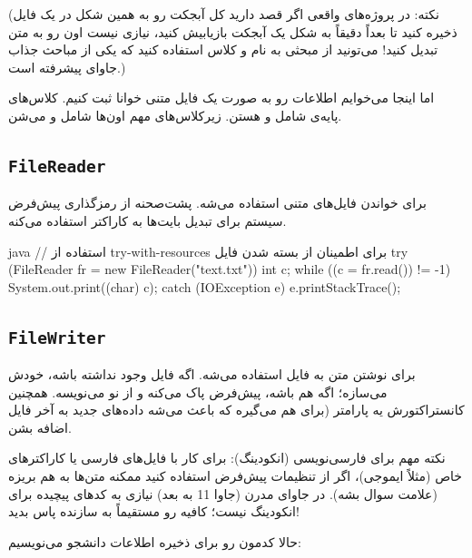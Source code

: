 (نکته: در پروژه‌های واقعی اگر قصد دارید کل آبجکت  رو
به همین شکل در یک فایل ذخیره کنید تا بعداً دقیقاً به شکل یک آبجکت بازیابیش
کنید، نیازی نیست اون رو به متن تبدیل کنید! می‌تونید از مبحثی به نام
 و کلاس 
استفاده کنید که یکی از مباحث جذاب جاوای پیشرفته است.)

اما اینجا می‌خوایم اطلاعات رو به صورت یک فایل متنی خوانا ثبت کنیم.
کلاس‌های پایه‌ی  شامل  و
 هستن. زیرکلاس‌های مهم اون‌ها شامل
 و  می‌شن.

\subsection{\texttt{FileReader}}

برای خواندن فایل‌های متنی استفاده می‌شه. پشت‌صحنه از رمزگذاری پیش‌فرض سیستم
برای تبدیل بایت‌ها به کاراکتر استفاده می‌کنه.

\begin{codebox}{java}
// استفاده از try-with-resources برای اطمینان از بسته شدن فایل
try (FileReader fr = new FileReader("text.txt")) {
    int c;
    while ((c = fr.read()) != -1) {
        System.out.print((char) c);
    }
} catch (IOException e) {
    e.printStackTrace();
}
\end{codebox}

\subsection{\texttt{FileWriter}}

برای نوشتن متن به فایل استفاده می‌شه. اگه فایل وجود نداشته باشه، خودش
می‌سازه؛ اگه هم باشه، پیش‌فرض پاک می‌کنه و از نو می‌نویسه. همچنین
کانستراکتورش یه پارامتر  (برای  هم
می‌گیره که باعث می‌شه داده‌های جدید به آخر فایل اضافه بشن.

نکته مهم برای فارسی‌نویسی (انکودینگ): برای کار با فایل‌های فارسی یا
کاراکترهای خاص (مثلاً ایموجی)، اگر از تنظیمات پیش‌فرض استفاده کنید ممکنه
متن‌ها به هم بریزه (علامت سوال بشه). در جاوای مدرن (جاوا 11 به بعد) نیازی
به کدهای پیچیده برای انکودینگ نیست؛ کافیه
 رو مستقیماً به سازنده پاس بدید!

حالا کدمون رو برای ذخیره اطلاعات دانشجو می‌نویسیم:

